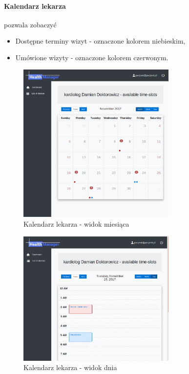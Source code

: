 \documentclass[polish,12pt]{aghthesis}
\begin{document}
    \paragraph{Kalendarz lekarza}{ pozwala zobaczyć
    \begin{itemize}
        \item Dostępne terminy wizyt - oznaczone kolorem niebieskim,
        \item Umówione wizyty - oznaczone kolorem czerwonym.
    \end{itemize}
    
    
    \begin{figure}[H]
        \includegraphics[width=0.7\textwidth]{gui-calendar-patient-month}
        \caption{Kalendarz lekarza - widok miesiąca}
    \end{figure}    
    \begin{figure}[H]
        \includegraphics[width=0.7\textwidth]{gui-calendar-patient-day}
        \caption{Kalendarz lekarza - widok dnia}
    \end{figure}    
    }
\end{document}
